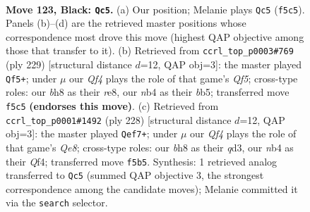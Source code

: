 \documentclass[11pt]{article}
\begin{document}
\begin{figure}[p]\centering
\begin{subfigure}{0.46\textwidth}\centering
\resizebox{\linewidth}{!}{%
\newchessgame
\chessboard[
  setfen={7B/3k4/8/5q2/KN6/8/8/8 b - - 15 123},
  showmover=false,
  pgfstyle=straightmove, color=movearrow, markmove={f5-c5}
]}
\caption{}
\end{subfigure}\hfill
\begin{subfigure}{0.46\textwidth}\centering
\resizebox{\linewidth}{!}{%
\newchessgame
\chessboard[
  setfen={4R3/8/3k4/1B6/5q2/2N5/2K5/8 b - - 30 115},
  showmover=false,
  pgfstyle=straightmove, color=movearrow, markmove={f4-f5}
]}
\caption{}
\end{subfigure}
\\[4pt]
\begin{subfigure}{0.46\textwidth}\centering
\resizebox{\linewidth}{!}{%
\newchessgame
\chessboard[
  setfen={2K1Q3/6k1/8/8/5Q2/3q4/8/8 w - - 2 115},
  showmover=false,
  pgfstyle=straightmove, color=movearrow, markmove={e8-f7}
]}
\caption{}
\end{subfigure}\hfill

\caption{\textbf{Move 123, Black: \texttt{Qc5}.} (a) Our position; Melanie plays \texttt{Qc5} (\texttt{f5c5}). Panels (b)--(d) are the retrieved master positions whose correspondence most drove this move (highest QAP objective among those that transfer to it). (b) Retrieved from \texttt{ccrl\_top\_p0003\#769} (ply 229) [structural distance $d$=12, QAP obj=3]: the master played \texttt{Qf5+}; under $\mu$ our \emph{Qf4} plays the role of that game's \emph{Qf5}; cross-type roles: our \emph{b}h8 as their \emph{r}e8, our \emph{n}b4 as their \emph{b}b5; transferred move \texttt{f5c5} \textbf{(endorses this move)}. (c) Retrieved from \texttt{ccrl\_top\_p0001\#1492} (ply 228) [structural distance $d$=12, QAP obj=3]: the master played \texttt{Qef7+}; under $\mu$ our \emph{Qf4} plays the role of that game's \emph{Qe8}; cross-type roles: our \emph{b}h8 as their \emph{q}d3, our \emph{n}b4 as their \emph{Q}f4; transferred move \texttt{f5b5}. Synthesis: 1 retrieved analog transferred to \texttt{Qc5} (summed QAP objective 3, the strongest correspondence among the candidate moves); Melanie committed it via the \texttt{search} selector.}
\label{fig:thought-m245}
\end{figure}

\clearpage
\end{document}
